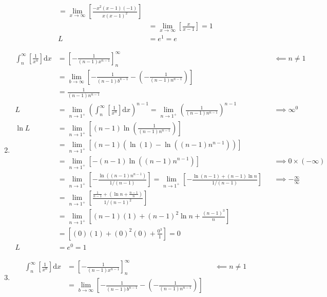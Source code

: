 \documentclass[12pt, A4]{report}
\renewcommand{\d}{\text{d}}
\begin{document}
\begin{enumerate}
\begin{align*}
								= \lim_{x\to\infty}\left[\frac{-x^2(x - 1)(-1)}{x(x - 1)^2}\right] \\
							&= \lim_{x\to\infty}\left[\frac{x}{x - 1}\right] = 1 \\
						L &= e^1 
								= e
					\end{align*}
				\item
					\begin{align*}
						\int_n^{\infty}\left[\frac{1}{x^n}\right]\d x &= \left[-\frac{1}{(n - 1)x^{n - 1}}\right]_n^\infty 
								&&\impliedby n \ne 1 \\
							&= \lim_{b\to\infty}\left[-\frac{1}{(n - 1)b^{n - 1}} - \left(-\frac{1}{(n - 1)n^{n - 1}}\right)\right] \\
							&= \frac{1}{(n - 1)n^{n - 1}} \\
						L &= \lim_{n\to 1^+}\left(\int_n^{\infty}\left[\frac{1}{x^n}\right]\d x\right)^{n - 1}
								= \lim_{n\to 1^+}\left(\frac{1}{(n - 1)n^{n - 1}}\right)^{n - 1}
								&&\implies \infty^0 \\
						\ln L &= \lim_{n\to 1^+}\left[(n - 1)\ln\left(\frac{1}{(n - 1)n^{n - 1}}\right)\right] \\
								&= \lim_{n\to 1^+}\left[(n - 1)\left(\ln(1) - \ln\left((n - 1)n^{n - 1}\right)\right)\right] \\
								&= \lim_{n\to 1^+}\left[-(n - 1)\ln\left((n - 1)n^{n - 1}\right)\right]
									&&\implies 0 \times (-\infty) \\
							&= \lim_{n\to 1^+}\left[-\frac{\ln\left((n - 1)n^{n - 1}\right)}{1/(n - 1)}\right] = \lim_{n\to 1^+}\left[-\frac{\ln(n - 1) + (n - 1)\ln n}{1/(n - 1)}\right]
								&&\implies -\frac{\infty}{\infty} \\
							&= \lim_{n\to 1^+}\left[\frac{\frac{1}{n - 1} + \left(\ln n + \frac{n - 1}{n}\right)}{1/(n - 1)^2}\right] \\
							&= \lim_{n\to 1^+}\left[(n - 1)(1) +  (n - 1)^2\ln n + \frac{(n - 1)^3}{n}\right] \\
							&= \left[(0)(1) + (0)^2(0) + \frac{0^3}{1}\right]
								= 0 \\ 
							L &= e^0 
									= 1
					\end{align*}
				\item
					\begin{align*}
						\int_n^{\infty}\left[\frac{1}{x^n}\right]\d x &= \left[-\frac{1}{(n - 1)x^{n - 1}}\right]_n^\infty 
								&&\impliedby n \ne 1 \\
							&= \lim_{b\to\infty}\left[-\frac{1}{(n - 1)b^{n - 1}} - \left(-\frac{1}{(n - 1)n^{n - 1}}\right)\right] \\

\end{align*}
\end{enumerate}
\end{document}
